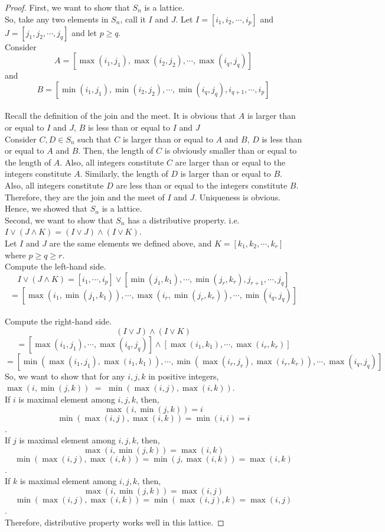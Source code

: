 \documentclass[a4paper, 12pt]{article}
\begin{document}
\begin{proof}
First, we want to show that $S_n$ is a lattice.\\
So, take any two elements in $S_n$, call it $I$ and $J$. Let $I = [i_1, i_2, \cdots, i_p]$ and $J = [j_1, j_2, \cdots, j_q]$ and let $p \geq q$.\\
Consider $$A = [\max(i_1, j_1), \max(i_2, j_2), \cdots, \max(i_q, j_q)]$$ and $$B = [\min(i_1, j_1), \min(i_2, j_2), \cdots, \min(i_q, j_q), i_{q+1}, \cdots, i_p]$$\\
Recall the definition of the join and the meet. It is obvious that $A$ is larger than or equal to $I$ and $J$, $B$ is less than or equal to $I$ and $J$\\
Consider $C, D \in S_n$ such that $C$ is larger than or equal to $A$ and $B$, $D$ is less than or equal to $A$ and $B$. Then, the length of $C$ is obviously smaller than or equal to the length of $A$. Also, all integers constitute $C$ are larger than or equal to the integers constitute $A$. Similarly, the length of $D$ is larger than or equal to $B$. Also, all integers constitute $D$ are less than or equal to the integers constitute $B$. Therefore, they are the join and the meet of $I$ and $J$. Uniqueness is obvious. Hence, we showed that $S_n$ is a lattice.\\
Second, we want to show that $S_n$ has a distributive property. i.e. $I\vee(J\wedge K) = (I\vee J)\wedge(I\vee K)$.\\
Let $I$ and $J$ are the same elements we defined above, and $K = [k_1, k_2, \cdots, k_r]$ where $p \geq q \geq r$.\\
Compute the left-hand side. $$I \vee (J \wedge K) = [i_1, \cdots, i_p] \vee [\min(j_1, k_1), \cdots, \min(j_r, k_r), j_{r+1}, \cdots, j_q]$$ $$=[\max(i_1, \min(j_1, k_1)), \cdots, \max(i_r, \min(j_r, k_r)), \cdots, \min(i_q, j_q)]$$\\
Compute the right-hand side. $$(I\vee J)\wedge(I\vee K)$$ $$= [\max(i_1, j_1), \cdots, \max(i_q, j_q)] \wedge [\max(i_1, k_1), \cdots, \max(i_r, k_r)]$$ $$=[\min(\max(i_1, j_1), \max(i_1, k_1)), \cdots, \min(\max(i_r, j_r), \max(i_r, k_r)), \cdots, \max(i_q, j_q)]$$
So, we want to show that for any $i, j, k$ in positive integers, $\max(i, \min(j, k))$ $=$ $\min(\max(i, j), \max(i, k))$.\\
If $i$ is maximal element among $i, j, k$, then, $$\max(i, \min(j, k)) = i$$$$\min(\max(i, j), \max(i, k))=\min(i, i) = i$$.\\
If $j$ is maximal element among $i, j, k$, then, $$\max(i, \min(j, k)) = \max(i, k)$$$$\min(\max(i, j), \max(i, k)) = \min(j, \max(i, k)) = \max(i, k)$$.\\
If $k$ is maximal element among $i, j, k$, then, $$\max(i, \min(j, k)) = \max(i, j)$$$$\min(\max(i, j), \max(i, k))=\min(\max(i, j), k) = \max(i, j)$$.\\
Therefore, distributive property works well in this lattice.
\end{proof}
\end{document}
